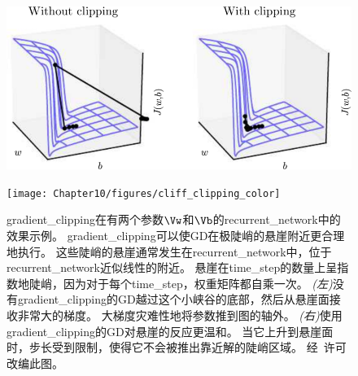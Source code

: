 \begin{figure}[!htb]
\ifOpenSource
\centerline{\includegraphics[scale=0.5]{images/105.png}}
\else
\centerline{\texttt{[image: Chapter10/figures/cliff\_clipping\_color]}}
\fi
\caption{\gls{gradient_clipping}在有两个参数$\Vw$和$\Vb$的\gls{recurrent_network}中的效果示例。
\gls{gradient_clipping}可以使\gls{GD}在极陡峭的悬崖附近更合理地执行。
这些陡峭的悬崖通常发生在\gls{recurrent_network}中，位于\gls{recurrent_network}近似线性的附近。
悬崖在\gls{time_step}的数量上呈指数地陡峭，因为对于每个\gls{time_step}，权重矩阵都自乘一次。
\emph{(左)}没有\gls{gradient_clipping}的\gls{GD}越过这个小峡谷的底部，然后从悬崖面接收非常大的梯度。
大梯度灾难性地将参数推到图的轴外。
\emph{(右)}使用\gls{gradient_clipping}的\gls{GD}对悬崖的反应更温和。
当它上升到悬崖面时，步长受到限制，使得它不会被推出靠近解的陡峭区域。
经~\citet{Pascanu+al-ICML2013-small}许可改编此图。
}
\label{fig:chap10_cliff_clipping_color}
\end{figure}


